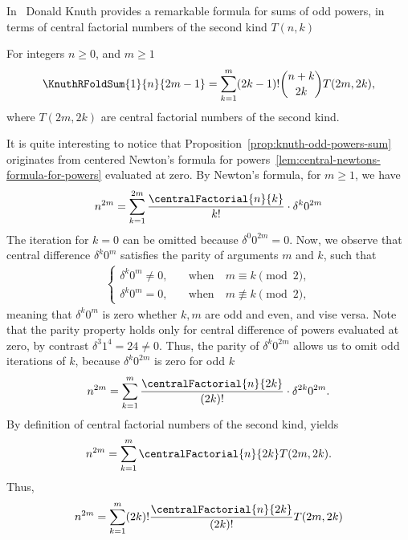 In~\cite{knuth1993johann} Donald Knuth provides a remarkable formula for
sums of odd powers,
in terms of central factorial numbers of the second kind $T(n,k)$
\begin{proposition}
  \label{prop:knuth-odd-powers-sum}
  For integers $n \geq 0$, and $m\geq 1$
  \begin{align*}
    \KnuthRFoldSum{1}{n}{2m-1} = \sum_{k=1}^{m} (2k-1)! \binom{n+k}{2k} T(2m,2k),
  \end{align*}
  where $T(2m,2k)$ are central factorial numbers of the second kind.
\end{proposition}
It is quite interesting to notice that Proposition~\eqref{prop:knuth-odd-powers-sum}
originates from centered
Newton's formula for powers~\eqref{lem:central-newtons-formula-for-powers}
evaluated at zero.
By Newton's formula, for $m\geq 1$, we have
\begin{align*}
  n^{2m} = \sum_{k=1}^{2m} \frac{\centralFactorial{n}{k}}{k!} \cdot \delta^{k} 0^{2m}
\end{align*}
The iteration for $k=0$ can be omitted because $\delta^{0} 0^{2m} = 0$.
Now, we observe that central difference $\delta^k 0^m$ satisfies the parity of
arguments $m$ and $k$, such that
\begin{align*}
  \begin{cases}
    \delta^{k} 0^m \neq 0, \quad &\text{when} \quad m \equiv k \pmod{2}, \\
    \delta^{k} 0^m = 0, \quad &\text{when} \quad m \not\equiv k \pmod{2},
  \end{cases}
\end{align*}
meaning that $\delta^{k} 0^m$ is zero whether $k,m$ are odd and even, and vise versa.
Note that the parity property holds only for central difference of powers
evaluated at zero, by contrast $\delta^{3} 1^{4} = 24  \neq 0$.
Thus, the parity of $\delta^{k} 0^{2m}$ allows us
to omit odd iterations of $k$, because $\delta^{k} 0^{2m}$ is zero for odd $k$
\begin{align*}
  n^{2m} = \sum_{k=1}^{m} \frac{\centralFactorial{n}{2k}}{(2k)!} \cdot \delta^{2k} 0^{2m}.
\end{align*}
By definition of central factorial numbers of the second kind, yields
\begin{align*}
  n^{2m} = \sum_{k=1}^{m} \centralFactorial{n}{2k} T(2m,2k).
\end{align*}
Thus,
\begin{align*}
  n^{2m} = \sum_{k=1}^{m} (2k)! \frac{\centralFactorial{n}{2k}}{(2k)!} T(2m,2k)
\end{align*}
